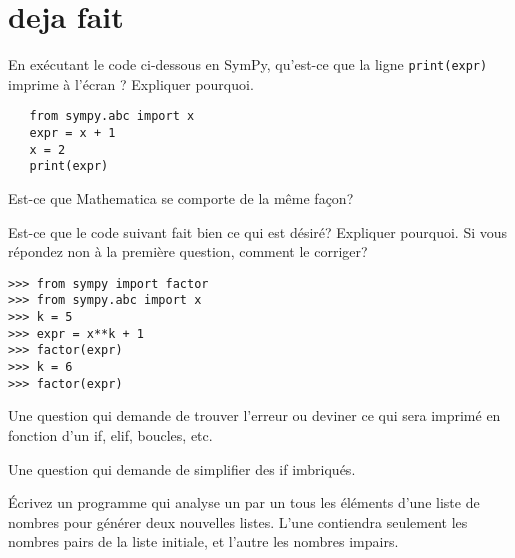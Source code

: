 \section{deja fait}

\begin{exercice}
En exécutant le code ci-dessous en SymPy, qu'est-ce que la ligne
\texttt{print(expr)} imprime à l'écran ? Expliquer pourquoi.
\begin{verbatim}
   from sympy.abc import x
   expr = x + 1
   x = 2
   print(expr)
\end{verbatim}
Est-ce que Mathematica se comporte de la même façon?
\end{exercice}

\begin{exercice}
Est-ce que le code suivant fait bien ce qui est désiré? Expliquer pourquoi.
Si vous répondez non à la première question, comment le corriger?
\begin{verbatim}
>>> from sympy import factor
>>> from sympy.abc import x
>>> k = 5
>>> expr = x**k + 1
>>> factor(expr)
>>> k = 6
>>> factor(expr)
\end{verbatim}
\end{exercice}


\begin{question}
    Une question qui demande de trouver l'erreur ou deviner ce qui sera
    imprimé en fonction d'un if, elif, boucles, etc.
\end{question}

\begin{question}
    Une question qui demande de simplifier des if imbriqués.
\end{question}

\begin{question}
Écrivez un programme qui analyse un par un tous les éléments d’une liste de
nombres pour générer deux nouvelles listes. L’une contiendra seulement les
nombres pairs de la liste initiale, et l’autre les nombres impairs.
\end{question}

